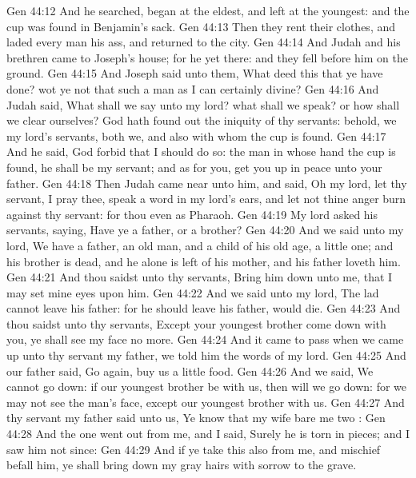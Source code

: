 \vs Gen 44:12 And he searched,  began at the eldest, and left at the youngest: and the cup was found in Benjamin's sack.
\vs Gen 44:13 Then they rent their clothes, and laded every man his ass, and returned to the city.
\vs Gen 44:14 And Judah and his brethren came to Joseph's house; for he  yet there: and they fell before him on the ground.
\vs Gen 44:15 And Joseph said unto them, What deed  this that ye have done? wot ye not that such a man as I can certainly divine?
\vs Gen 44:16 And Judah said, What shall we say unto my lord? what shall we speak? or how shall we clear ourselves? God hath found out the iniquity of thy servants: behold, we  my lord's servants, both we, and  also with whom the cup is found.
\vs Gen 44:17 And he said, God forbid that I should do so:  the man in whose hand the cup is found, he shall be my servant; and as for you, get you up in peace unto your father.
\vs Gen 44:18 Then Judah came near unto him, and said, Oh my lord, let thy servant, I pray thee, speak a word in my lord's ears, and let not thine anger burn against thy servant: for thou  even as Pharaoh.
\vs Gen 44:19 My lord asked his servants, saying, Have ye a father, or a brother?
\vs Gen 44:20 And we said unto my lord, We have a father, an old man, and a child of his old age, a little one; and his brother is dead, and he alone is left of his mother, and his father loveth him.
\vs Gen 44:21 And thou saidst unto thy servants, Bring him down unto me, that I may set mine eyes upon him.
\vs Gen 44:22 And we said unto my lord, The lad cannot leave his father: for  he should leave his father,  would die.
\vs Gen 44:23 And thou saidst unto thy servants, Except your youngest brother come down with you, ye shall see my face no more.
\vs Gen 44:24 And it came to pass when we came up unto thy servant my father, we told him the words of my lord.
\vs Gen 44:25 And our father said, Go again,  buy us a little food.
\vs Gen 44:26 And we said, We cannot go down: if our youngest brother be with us, then will we go down: for we may not see the man's face, except our youngest brother  with us.
\vs Gen 44:27 And thy servant my father said unto us, Ye know that my wife bare me two :
\vs Gen 44:28 And the one went out from me, and I said, Surely he is torn in pieces; and I saw him not since:
\vs Gen 44:29 And if ye take this also from me, and mischief befall him, ye shall bring down my gray hairs with sorrow to the grave.
